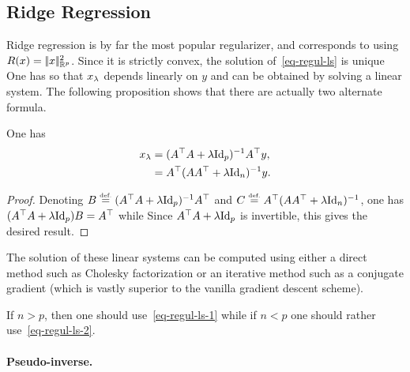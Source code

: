 \subsection{Ridge Regression}

Ridge regression is by far the most popular regularizer, and corresponds to using $R(x)=|\!| x |\!|^2_{\mathbb{R}^p}$. Since it is strictly convex, the solution of~\eqref{eq-regul-ls} is unique
One has 
so that $x_\lambda$ depends linearly on $y$ and can be obtained by solving a linear system. The following proposition shows that there are actually two alternate formula.

\begin{prop}
	One has
	\begin{align}
		x_\lambda &= (A^\top A + \lambda \mathrm{Id}_p)^{-1} A^\top y,  \label{eq-regul-ls-1} \\
			 &= A^\top (A A^\top + \lambda \mathrm{Id}_n)^{-1} y. \label{eq-regul-ls-2} 
	\end{align}
\end{prop}

\begin{proof}
	Denoting $B \stackrel{\mbox{\upshape\tiny def.}}{=} (A^\top A + \lambda \mathrm{Id}_p)^{-1} A^\top$ and $C \stackrel{\mbox{\upshape\tiny def.}}{=} A^\top (A A^\top + \lambda \mathrm{Id}_n)^{-1}$, 
	one has $(A^\top A + \lambda \mathrm{Id}_p) B = A^\top$ while 
	Since $A^\top A + \lambda \mathrm{Id}_p$ is invertible, this gives the desired result.
\end{proof}

The solution of these linear systems can be computed using either a direct method such as Cholesky factorization or an iterative method such as a conjugate gradient (which is vastly superior to the vanilla gradient descent scheme).

If $n>p$, then one should use~\eqref{eq-regul-ls-1} while if $n<p$ one should rather use~\eqref{eq-regul-ls-2}.  

\paragraph{Pseudo-inverse.}

